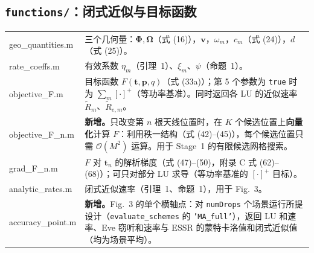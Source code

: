 \documentclass[11pt,a4paper]{ctexart}
\newcommand{\code}[1]{\texttt{#1}}
\newcommand{\bt}{\mathbf t}
\begin{document}
\subsection{\code{functions/}：闭式近似与目标函数}
\begin{longtable}{>{\ttfamily\small}p{4.6cm}p{11.2cm}}
\toprule
geo\_quantities.m & 三个几何量：$\boldsymbol\Phi,\boldsymbol\Omega$（式 (16)），$\mathbf v$，$\omega_m$，$c_m$（式 (24)），$d$（式 (25)）。\\
rate\_coeffs.m & 有效系数 $\eta_m$（引理~1）、$\xi_m$、$\psi$（命题~1）。\\
objective\_F.m & 目标函数 $F(\bt,\mathbf p,q)$（式 (33a)）；第 5 个参数为 \code{true} 时为 $\sum_m[\cdot]^+$（等功率基准）。同时返回各 LU 的近似速率 $\tilde R_m$、$\tilde R_{e,m}$。\\
objective\_F\_n.m & \textbf{新增。}只改变第 $n$ 根天线位置时，在 $K$ 个候选位置上\textbf{向量化}计算 $F$：利用秩一结构（式 (42)--(45)），每个候选位置只需 $\mathcal O(M^2)$ 运算。用于 Stage~1 的有限候选网格搜索。\\
grad\_F\_n.m & $F$ 对 $\bt_n$ 的解析梯度（式 (47)--(50)，附录 C 式 (62)--(68)）；可只对部分 LU 求导（等功率基准的 $[\cdot]^+$ 目标）。\\
analytic\_rates.m & 闭式近似速率（引理~1、命题~1），用于 Fig.~3。\\
accuracy\_point.m & \textbf{新增。}Fig.~3 的单个横轴点：对 \code{numDrops} 个场景运行所提设计（\code{evaluate\_schemes} 的 \code{'MA\_full'}），返回 LU 和速率、Eve 窃听和速率与 ESSR 的蒙特卡洛值和闭式近似值（均为场景平均）。\\
\bottomrule
\end{longtable}
\end{document}
